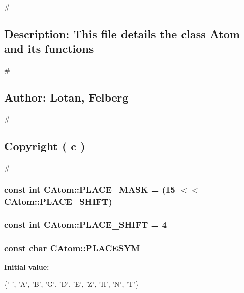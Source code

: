 \# \subsection*{Description\-: This file details the class Atom and its functions}

\# \subsection*{Author\-: Lotan, Felberg}

\# \subsection*{Copyright ( c )}

\# \hypertarget{classCAtom_a03572c4dc279704a994647c54249a1f6}{
\subsubsection[{P\-L\-A\-C\-E\-\_\-\-M\-A\-S\-K}]{\setlength{\rightskip}{0pt plus 5cm}const int C\-Atom\-::\-P\-L\-A\-C\-E\-\_\-\-M\-A\-S\-K = (15 $<$$<${\bf C\-Atom\-::\-P\-L\-A\-C\-E\-\_\-\-S\-H\-I\-F\-T})\hspace{0.3cm}{\ttfamily [static]}}}\label{classCAtom_a03572c4dc279704a994647c54249a1f6}
\hypertarget{classCAtom_a86677e582ce1bbdd16d6af1807804aa0}{
\subsubsection[{P\-L\-A\-C\-E\-\_\-\-S\-H\-I\-F\-T}]{\setlength{\rightskip}{0pt plus 5cm}const int C\-Atom\-::\-P\-L\-A\-C\-E\-\_\-\-S\-H\-I\-F\-T = 4\hspace{0.3cm}{\ttfamily [static]}}}\label{classCAtom_a86677e582ce1bbdd16d6af1807804aa0}
\hypertarget{classCAtom_af438732d59641738cfea16a7dd895dea}{
\subsubsection[{P\-L\-A\-C\-E\-S\-Y\-M}]{\setlength{\rightskip}{0pt plus 5cm}const char C\-Atom\-::\-P\-L\-A\-C\-E\-S\-Y\-M\hspace{0.3cm}{\ttfamily [static]}}}\label{classCAtom_af438732d59641738cfea16a7dd895dea}
{\bfseries Initial value\-:}
\begin{DoxyCode}
 \{\textcolor{charliteral}{' '}, \textcolor{charliteral}{'A'}, \textcolor{charliteral}{'B'}, \textcolor{charliteral}{'G'}, \textcolor{charliteral}{'D'}, \textcolor{charliteral}{'E'}, 
                         \textcolor{charliteral}{'Z'}, \textcolor{charliteral}{'H'}, \textcolor{charliteral}{'N'}, \textcolor{charliteral}{'T'}\}
\end{DoxyCode}


